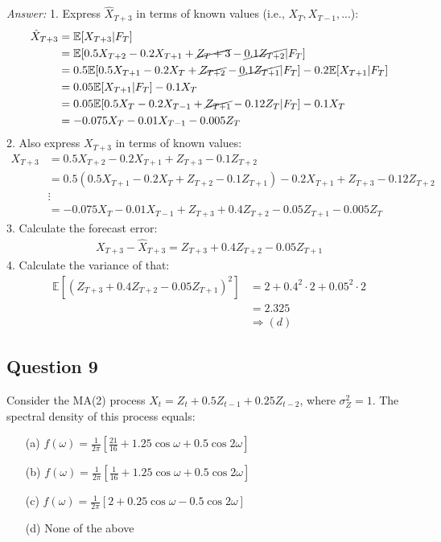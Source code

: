 \begin{footnotesize}
    \textit{Answer:} 1. Express $\hat{X}_{T+3}$ in terms of known values (i.e., $X_T,X_{T-1}, ...$): 
    \begin{align*}
        \hat{X}_{T+3} &= \mathbb{E}[X_{T+3}|F_T]\\
        &= \mathbb{E}[0.5X_{T+2}-0.2X_{T+1}+\cancel{Z_T+3} -\cancel{0.1Z_{T+2}}|F_T] \\
        &= 0.5 \mathbb{E}[0.5X_{T+1} - 0.2 X_{T} + \cancel{Z_{T+2}} - \cancel{0.1Z_{T+1}}|F_T]- 0.2\mathbb{E}[X_{T+1}|F_T] \\
        &= 0.05 \mathbb{E}[X_{T+1}|F_T]-0.1X_T\\
        &=0.05\mathbb{E}[0.5X_T-0.2X_{T-1}+\cancel{Z_{T+1}}-0.12Z_T|F_T]-0.1X_T\\
        &= -0.075X_T -0.01X_{T-1}-0.005Z_T
    \end{align*}
    2. Also express $X_{T+3}$ in terms of known values: 
    \begin{align*}
        X_{T+3} &= 0.5X_{T+2}-0.2 X_{T+1} + Z_{T+3} -0.1Z_{T+2} \\
        &= 0.5(0.5X_{T+1}-0.2X_T + Z_{T+2} -0.1Z_{T+1}) -0.2X_{T+1} + Z_{T+3} -0.12Z_{T+2} \\
        &\vdots \\
        &= -0.075X_T-0.01X_{T-1} + Z_{T+3} +0.4 Z_{T+2} -0.05Z_{T+1} -0.005Z_T
    \end{align*}
    3. Calculate the forecast error: \begin{align*}
        X_{T+3}-\hat{X}_{T+3} = Z_{T+3} + 0.4Z_{T+2}-0.05 Z_{T+1}
    \end{align*}
    4. Calculate the variance of that:
    \begin{align*}
        \mathbb{E}[(Z_{T+3} + 0.4Z_{T+2}-0.05 Z_{T+1})^2] &= 2 + 0.4^2\cdot2 + 0.05^2\cdot2\\
        &=2.325 \\
        &\Rightarrow (d)
    \end{align*}
\end{footnotesize}


\subsection*{Question 9}

Consider the MA(2) process $X_t = Z_t +0.5 Z_{t-1} + 0.25 Z_{t-2}$, where $\sigma_Z^2=1$. The spectral density of this process equals:

\begin{itemize}
    \item[(a)] $f(\omega)= \frac{1}{2\pi}\left[\frac{21}{16} + 1.25\cos{\omega} + 0.5\cos{2 \omega} \right]$
    \item[(b)] $f(\omega)= \frac{1}{2\pi}\left[\frac{1}{16} + 1.25\cos{\omega} + 0.5\cos{2 \omega} \right]$
    \item[(c)] $f(\omega)= \frac{1}{2\pi}\left[2 + 0.25\cos{\omega} - 0.5\cos{2 \omega} \right]$
    \item[(d)] None of the above
\end{itemize}


